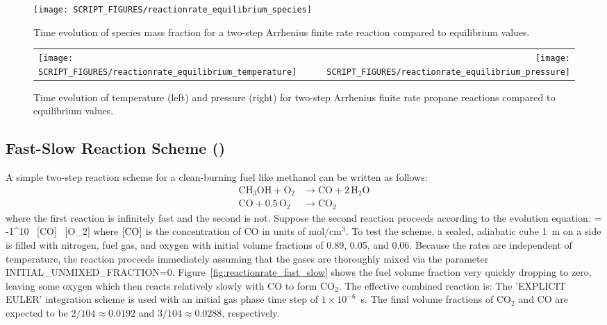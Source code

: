 \documentclass[11pt]{book}
\begin{document}
\begin{figure}[h!]
\centering
\texttt{[image: SCRIPT\_FIGURES/reactionrate\_equilibrium\_species]}
\caption[Species evolution in an equilibrium case]{Time evolution of species mass fraction for a two-step Arrhenius finite rate reaction compared to equilibrium values.}
\label{fig:Arrhenius_2Order_1stepb}
\end{figure}

\begin{figure}[ht]
\begin{tabular*}{\textwidth}{lr}
\texttt{[image: SCRIPT\_FIGURES/reactionrate\_equilibrium\_temperature]} &
\texttt{[image: SCRIPT\_FIGURES/reactionrate\_equilibrium\_pressure]}
\end{tabular*}
\caption[Temperature and pressure evolution for equilibrium case]{Time evolution of temperature (left) and pressure (right) for two-step Arrhenius finite rate propane reactions compared to equilibrium values.}
\label{fig:Arrhenius_175Order_23stepb}
\end{figure}


\FloatBarrier

\subsection{Fast-Slow Reaction Scheme (\texorpdfstring{}{reactionrate\_fast\_slow})}
\label{reactionrate_fast_slow}

A simple two-step reaction scheme for a clean-burning fuel like methanol can be written as follows:
\begin{subequations}
\begin{align}
\label{methanol_step1}
\mathrm{CH_3OH + O_2} &\rightarrow \mathrm{CO + 2 \, H_2O} \\
\label{methanol_step2}
\mathrm{CO + 0.5 \, O_2} &\rightarrow \mathrm{CO_2}
\end{align}
\end{subequations}
where the first reaction is infinitely fast and the second is not. Suppose the second reaction proceeds according to the evolution equation:
\be
    = -1^{10} \, [{\rm CO}] \, [{\rm O_2}]
\ee
where $[{\rm CO}]$ is the concentration of CO in units of mol/cm$^3$. To test the scheme, a sealed, adiabatic cube 1~m on a side is filled with nitrogen, fuel gas, and oxygen with initial volume fractions of 0.89, 0.05, and 0.06. Because the rates are independent of temperature, the reaction proceeds immediately assuming that the gases are thoroughly mixed via the parameter {\ct INITIAL\_UNMIXED\_FRACTION=0}. Figure~\ref{fig:reactionrate_fast_slow} shows the fuel volume fraction very quickly dropping to zero, leaving some oxygen which then reacts relatively slowly with CO to form CO$_2$. The effective combined reaction is:
\be
\label{methanol_combined}
 \rightarrow {}
\ee
The {\ct 'EXPLICIT EULER'} integration scheme is used with an initial gas phase time step of $1\times 10^{-6}$~s. The final volume fractions of CO$_2$ and CO are expected to be $2/104 \approx 0.0192$ and $3/104 \approx 0.0288$, respectively.
\end{document}
